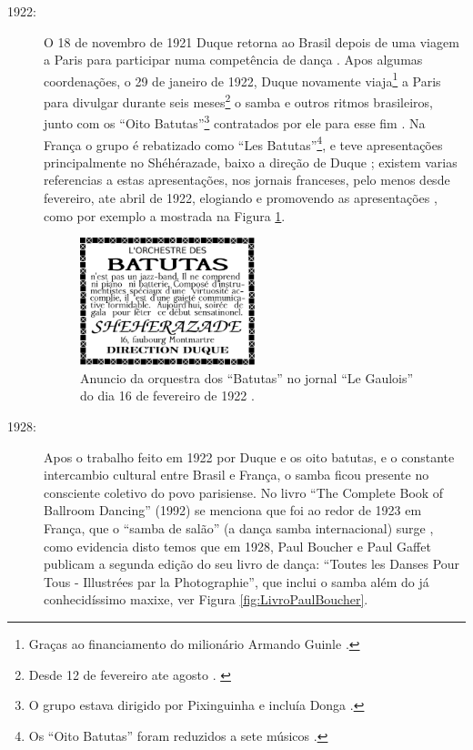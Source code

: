 \begin{description}
\item[1922:] O 18 de novembro de 1921 Duque retorna ao Brasil depois de uma viagem a Paris 
para participar numa competência de dança \cite[pp. 465]{marcondes1977enciclopedia} \cite[pp. 3]{duque1921:a}.
Apos algumas coordenações,
o 29 de janeiro de 1922, Duque novamente viaja\footnote{Graças 
ao financiamento do milionário Armando Guinle \cite[pp. 465]{marcondes1977enciclopedia}.} 
 a Paris para divulgar durante seis meses\footnote{Desde 
12 de fevereiro ate agosto \cite{BASTOS2005}. \cite[pp. 5]{batutas1922:c}} 
o samba e outros ritmos brasileiros, 
junto com os ``Oito Batutas''\footnote{O 
grupo estava dirigido por Pixinguinha e incluía Donga \cite{BASTOS2005}.} 
contratados por ele para esse fim
\cite[pp. 13]{duque1922:a} \cite[pp. 465]{marcondes1977enciclopedia}.
Na França o grupo é rebatizado como ``Les Batutas''\footnote{Os 
``Oito Batutas'' foram reduzidos a sete músicos \cite{BASTOS2005}.},
e teve apresentações principalmente no Shéhérazade, 
baixo a direção de Duque \cite[pp. 465]{marcondes1977enciclopedia} \cite{BASTOS2005};
existem varias referencias a estas apresentações, nos jornais franceses, pelo menos desde fevereiro,
ate abril de 1922, elogiando e promovendo as apresentações 
\cite[pp. 5]{batutas1922:a} \cite[pp. 4]{batutas1922:b} \cite{batutas1922:d},
como por exemplo a mostrada na Figura \ref{fig:LesBatutas}.


  \begin{figure}[h!]
    \centering
    \includegraphics[width=0.5\textwidth]{chapters/cap-historia-sambagafieira/batutas.eps}
    \caption{Anuncio da orquestra dos ``Batutas'' no jornal ``Le Gaulois'' do dia 16 de fevereiro de 1922 \cite[pp. 4]{batutas1922:b}.}
    \label{fig:LesBatutas}
  \end{figure}

\item[1928:] Apos o trabalho feito em 1922 por Duque e os oito batutas, e o constante intercambio cultural entre Brasil e França, 
o samba ficou presente no consciente coletivo do povo parisiense.
No livro ``The Complete Book of Ballroom Dancing'' (1992) se menciona que foi ao redor de 1923
em França, que o ``samba de salão'' (a dança samba internacional) surge \cite[pp. 45]{stephenson1992complete},
como evidencia disto temos que em 1928, 
Paul Boucher e Paul Gaffet publicam  a segunda edição do seu livro de dança:
``Toutes les Danses Pour Tous - Illustrées par la Photographie'',
que inclui o samba além do já conhecidíssimo maxixe, ver Figura \ref{fig:LivroPaulBoucher}.


\end{description}
